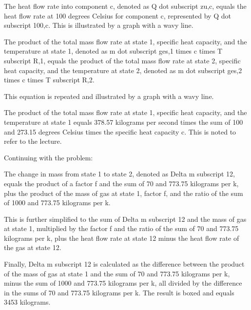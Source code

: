 The heat flow rate into component c, denoted as Q dot subscript zu,c, equals the heat flow rate at 100 degrees Celsius for component c, represented by Q dot subscript 100,c. This is illustrated by a graph with a wavy line.

The product of the total mass flow rate at state 1, specific heat capacity, and the temperature at state 1, denoted as m dot subscript ges,1 times c times T subscript R,1, equals the product of the total mass flow rate at state 2, specific heat capacity, and the temperature at state 2, denoted as m dot subscript ges,2 times c times T subscript R,2.

This equation is repeated and illustrated by a graph with a wavy line.

The product of the total mass flow rate at state 1, specific heat capacity, and the temperature at state 1 equals 378.57 kilograms per second times the sum of 100 and 273.15 degrees Celsius times the specific heat capacity c. This is noted to refer to the lecture.

Continuing with the problem:

The change in mass from state 1 to state 2, denoted as Delta m subscript 12, equals the product of a factor f and the sum of 70 and 773.75 kilograms per k, plus the product of the mass of gas at state 1, factor f, and the ratio of the sum of 1000 and 773.75 kilograms per k.

This is further simplified to the sum of Delta m subscript 12 and the mass of gas at state 1, multiplied by the factor f and the ratio of the sum of 70 and 773.75 kilograms per k, plus the heat flow rate at state 12 minus the heat flow rate of the gas at state 12.

Finally, Delta m subscript 12 is calculated as the difference between the product of the mass of gas at state 1 and the sum of 70 and 773.75 kilograms per k, minus the sum of 1000 and 773.75 kilograms per k, all divided by the difference in the sums of 70 and 773.75 kilograms per k. The result is boxed and equals 3453 kilograms.